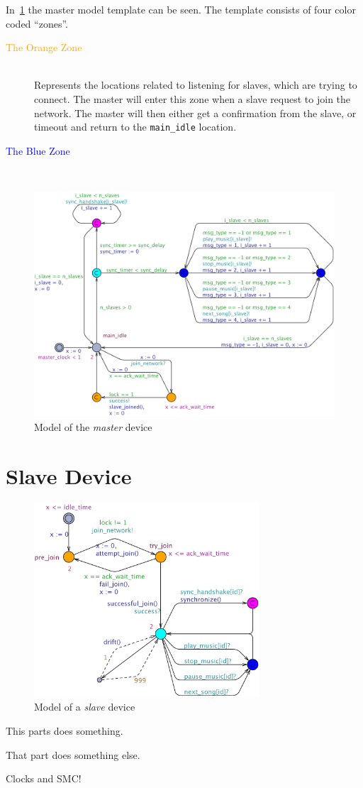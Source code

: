 In~\ref{fig:master_model} the master model template can be seen.
The template consists of four color coded \enquote{zones}.
\begin{description}
    \item[\textcolor{orange}{The Orange Zone}] \hfill\\
        Represents the locations related to listening for slaves, which are trying to connect.
        The master will enter this zone when a slave request to join the network.
        The master will then either get a confirmation from the slave, or timeout and return to the \texttt{main\_idle} location.

    \item[\textcolor{blue}{The Blue Zone}] \hfill\\

\end{description}

\begin{figure}[ht]
    \centering
    \includegraphics[width=1\textwidth]{master_model.pdf}
    \caption{Model of the \textit{master} device}\label{fig:master_model}
\end{figure}

\section{Slave Device}

\begin{figure}[ht]
    \centering
    \includegraphics[width=0.75\textwidth]{slave_model.pdf}
    \caption{Model of a \textit{slave} device}
\end{figure}
This parts does something.

That part does something else.

Clocks and SMC!


